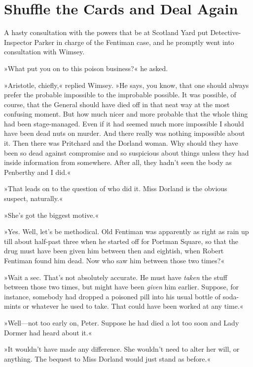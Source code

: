 \chapter{Shuffle the Cards and Deal Again}

\lettrine[lines=4]{A}{} hasty consultation with the powers that be at Scotland Yard put Detective-Inspector Parker in charge of the Fentiman case, and he promptly went into consultation with Wimsey.

\zz
»What put you on to this poison business?« he asked.

»Aristotle, chiefly,« replied Wimsey. »He says, you know, that one should always prefer the probable impossible to the improbable possible. It was possible, of course, that the General should have died off in that neat way at the most confusing moment. But how much nicer and more probable that the whole thing had been stage-managed. Even if it had seemed much more impossible I should have been dead nuts on murder. And there really was nothing impossible about it. Then there was Pritchard and the Dorland woman. Why should they have been so dead against compromise and so suspicious about things unless they had inside information from somewhere. After all, they hadn't seen the body as Penberthy and I did.«

»That leads on to the question of who did it. Miss Dorland is the obvious suspect, naturally.«

»She's got the biggest motive.«

»Yes. Well, let's be methodical. Old Fentiman was apparently as right as rain up till about half-past three when he started off for Portman Square, so that the drug must have been given him between then and eightish, when Robert Fentiman found him dead. Now who saw him between those two times?«

»Wait a sec. That's not absolutely accurate. He must have \textit{taken} the stuff between those two times, but might have been \textit{given} him earlier. Suppose, for instance, somebody had dropped a poisoned pill into his usual bottle of soda-mints or whatever he used to take. That could have been worked at any time.«

»Well—not too early on, Peter. Suppose he had died a lot too soon and Lady Dormer had heard about it.«

»It wouldn't have made any difference. She wouldn't need to alter her will, or anything. The bequest to Miss Dorland would just stand as before.«

